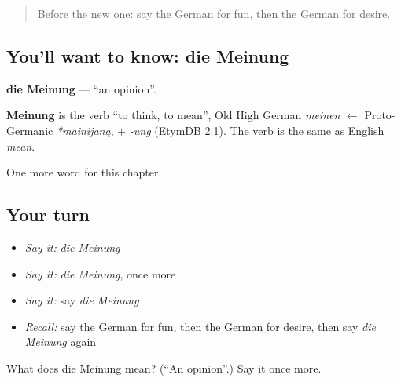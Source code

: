 \begin{quote}
Before the new one: say the German for fun, then the German for desire.
\end{quote}

\subsection*{You'll want to know: die Meinung}
\textbf{die Meinung} — \textquotedblleft{}an opinion\textquotedblright{}.

\begin{cousinweb}
\textbf{Meinung} is the verb \textquotedblleft{}to think, to mean\textquotedblright{}, Old High German \emph{meinen} $\leftarrow$ Proto-Germanic \emph{*mainijaną}, + \emph{-ung} (EtymDB 2.1). The verb is the same as English \emph{mean}.
\end{cousinweb}

\begin{grammarlens}[title={What you've built}]
One more word for this chapter.
\end{grammarlens}

\subsection*{Your turn}
\begin{itemize}
\raggedright
  \item \emph{Say it:} \emph{die Meinung}
  \item \emph{Say it:} \emph{die Meinung}, once more
  \item \emph{Say it:} say \emph{die Meinung}
  \item \emph{Recall:} say the German for fun, then the German for desire, then say \emph{die Meinung} again
\end{itemize}

\begin{tcolorbox}[breakable,colback=teal!4,colframe=teal!35!black,title={Before you move on}]
What does die Meinung mean? (\textquotedblleft{}An opinion\textquotedblright{}.) Say it once more.
\end{tcolorbox}
